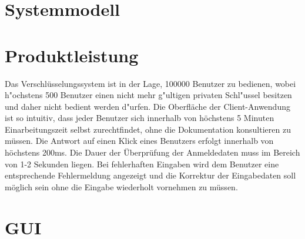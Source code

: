 \documentclass[a4paper,10pt]{scrartcl}
\begin{document}
\section{Systemmodell}





\section{Produktleistung}

\begin{usecase}
 {Das Verschlüsselungssystem ist in der Lage, 100000 Benutzer zu bedienen,
                wobei h"ochstens 500 Benutzer einen nicht mehr g"ultigen privaten Schl"ussel
                besitzen und daher nicht bedient werden d"urfen.}
 {Die Oberfläche der Client-Anwendung ist so intuitiv, dass jeder Benutzer
                sich innerhalb von höchstens 5 Minuten Einarbeitungszeit selbst
                zurechtfindet, ohne die Dokumentation konsultieren zu müssen.}
 {Die Antwort auf einen Klick eines Benutzers erfolgt innerhalb von
                höchstens 200ms.}
 {Die Dauer der Überprüfung der Anmeldedaten muss im Bereich von
                1-2 Sekunden liegen.}
 {Bei fehlerhaften Eingaben wird dem Benutzer eine entsprechende
                Fehlermeldung angezeigt und die Korrektur der Eingabedaten soll möglich sein
                ohne die Eingabe wiederholt vornehmen zu müssen.}
\end{usecase}

\section{GUI}
\end{document}
